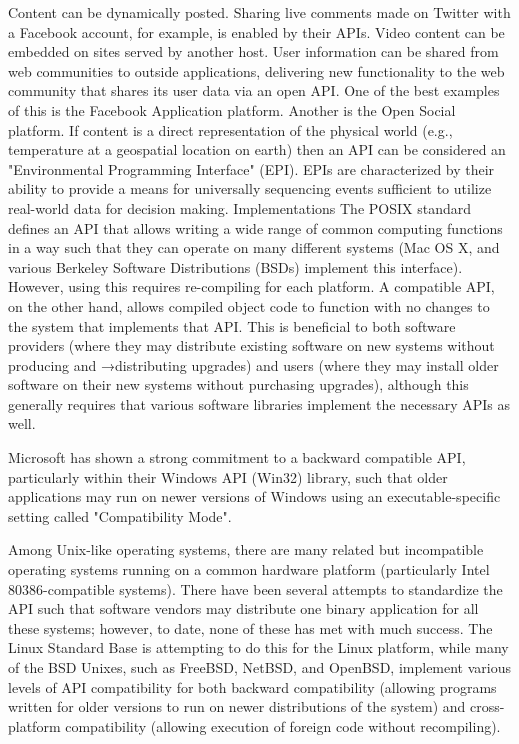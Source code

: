 Content can be dynamically posted. 
Sharing live comments made on Twitter with a Facebook account, for example, is enabled by their APIs.
Video content can be embedded on sites served by another host.
User information can be shared from web communities to outside applications, delivering new functionality to the web community that shares its user data via an open API. One of the best examples of this is the Facebook Application platform. 
Another is the Open Social platform.
If content is a direct representation of the physical world (e.g., temperature at a geospatial location on earth) then an API can be considered an "Environmental Programming Interface" (EPI). 
EPIs are characterized by their ability to provide a means for universally sequencing events sufficient to utilize real-world data for decision making.
Implementations
The POSIX standard defines an API that allows writing a wide range of common computing functions in a way such that they can operate on many different systems (Mac OS X, and various Berkeley Software Distributions (BSDs) implement this interface).
However, using this requires re-compiling for each platform. A compatible API, on the other hand, allows compiled object code to function with no changes to the system that implements that API. This is beneficial to both software providers (where they may distribute existing software on new systems without producing and →distributing upgrades) and users (where they may install older software on their new systems without purchasing upgrades), although this generally requires that various software libraries implement the necessary APIs as well.

Microsoft has shown a strong commitment to a backward compatible API, particularly within their Windows API (Win32) library, such that older applications may run on newer versions of Windows using an executable-specific setting called "Compatibility Mode".

Among Unix-like operating systems, there are many related but incompatible operating systems running on a common hardware platform (particularly Intel 80386-compatible systems). 
There have been several attempts to standardize the API such that software vendors may distribute one binary application for all these systems; however, to date, none of these has met with much success. 
The Linux Standard Base is attempting to do this for the Linux platform, while many of the BSD Unixes, such as FreeBSD, NetBSD, and OpenBSD, implement various levels of API compatibility for both backward compatibility (allowing programs written for older versions to run on newer distributions of the system) and cross-platform compatibility (allowing execution of foreign code without recompiling).

